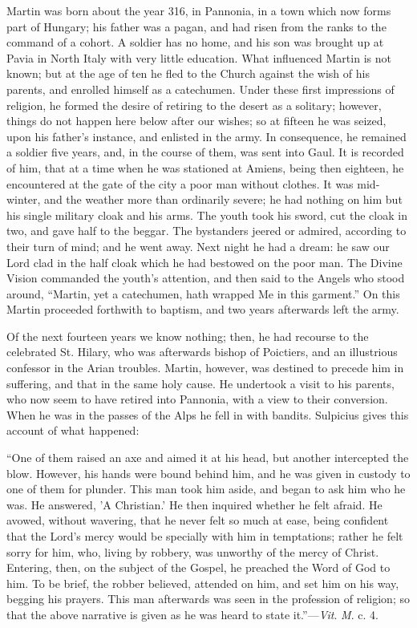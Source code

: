 Martin was born about the year 316, in Pannonia, in a town which
now forms part of Hungary; his father was a pagan, and had risen from
the ranks to the command of a cohort. A soldier has no home, and his
son was brought up at Pavia in North Italy with very little education.
What influenced Martin is not known; but at the age of ten he fled to
the Church against the wish of his parents, and enrolled himself as a
catechumen. Under these first impressions of religion, he formed the
desire of retiring to the desert as a solitary; however, things
do not happen here below after our wishes; so at fifteen he was
seized, upon his father's instance, and enlisted in the army. In
consequence, he remained a soldier five years, and, in the course of
them, was sent into Gaul. It is recorded of him, that at a time when
he was stationed at Amiens, being then eighteen, he encountered at the
gate of the city a poor man without clothes. It was mid-winter, and
the weather more than ordinarily severe; he had nothing on him but his
single military cloak and his arms. The youth took his sword, cut the
cloak in two, and gave half to the beggar. The bystanders jeered or
admired, according to their turn of mind; and he went away. Next night
he had a dream: he saw our Lord clad in the half cloak which he had
bestowed on the poor man. The Divine Vision commanded the youth's
attention, and then said to the Angels who stood around, ``Martin,
yet a catechumen, hath wrapped Me in this garment.'' On this
Martin proceeded forthwith to baptism, and two years afterwards left
the army.

Of the next fourteen years we know nothing; then, he had recourse
to the celebrated St. Hilary, who was afterwards bishop of Poictiers,
and an illustrious confessor in the Arian troubles. Martin, however,
was destined to precede him in suffering, and that in the same holy
cause. He undertook a visit to his parents, who now seem to have
retired into Pannonia, with a view to their conversion. When he was in
the passes of the Alps he fell in with bandits. Sulpicius gives this
account of what happened:

``One of them raised an axe and aimed it at his head, but
another intercepted the blow. However, his hands were bound behind
him, and he was given in custody to one of them for plunder. This man
took him aside, and began to ask him who he
was. He answered, 'A Christian.' He then inquired whether he felt
afraid. He avowed, without wavering, that he never felt so much at
ease, being confident that the Lord's mercy would be specially with
him in temptations; rather he felt sorry for him, who, living by
robbery, was unworthy of the mercy of Christ. Entering, then, on the
subject of the Gospel, he preached the Word of God to him. To be
brief, the robber believed, attended on him, and set him on his way,
begging his prayers. This man afterwards was seen in the profession of
religion; so that the above narrative is given as he was heard to
state it.''—\emph{Vit}. \emph{M}. c. 4.

